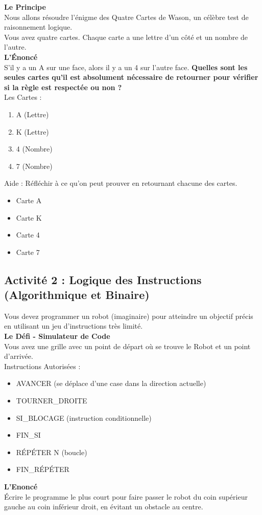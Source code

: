 \textbf{Le Principe}\\
Nous allons résoudre l’énigme des Quatre Cartes de Wason, un célèbre test de raisonnement logique.\\
Vous avez quatre cartes. Chaque carte a une lettre d'un côté et un nombre de l'autre.\\

%
\textbf{L'Énoncé}\\
S'il y a un A sur une face, alors il y a un 4 sur l'autre face.
\textbf{Quelles sont les seules cartes qu'il est absolument nécessaire de retourner pour vérifier si la règle est respectée ou non ?}\\
Les Cartes :
\begin{enumerate}
    \item A (Lettre)
    \item K (Lettre)
    \item 4 (Nombre)
    \item 7 (Nombre)
\end{enumerate}

Aide : Réfléchir à ce qu’on peut prouver en retournant chacune des cartes.
\begin{itemize}
    \item Carte A 
    \item Carte K 
    \item Carte 4 
    \item Carte 7 
\end{itemize}


%
\subsection*{Activité 2 : Logique des Instructions (Algorithmique et Binaire)}
Vous devez programmer un robot (imaginaire) pour atteindre un objectif précis en utilisant un jeu d'instructions très limité.\\

%
\textbf{Le Défi - Simulateur de Code}\\
Vous avez une grille avec un point de départ où se trouve le Robot et un point d'arrivée.\\
Instructions Autorisées :
\begin{itemize}
    \item AVANCER (se déplace d'une case dans la direction actuelle)
    \item TOURNER\_DROITE
    \item SI\_BLOCAGE (instruction conditionnelle)
    \item FIN\_SI
    \item RÉPÉTER N (boucle)
    \item FIN\_RÉPÉTER
\end{itemize}

%
\textbf{L’Enoncé}\\
 Écrire le programme le plus court pour faire passer le robot du coin supérieur gauche au coin inférieur droit, en évitant un obstacle au centre.

